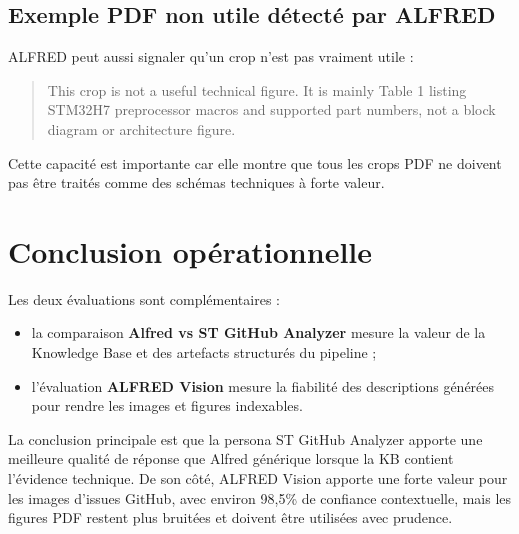 \documentclass[11pt,a4paper]{article}
\begin{document}
\subsection{Exemple PDF non utile détecté par ALFRED}

ALFRED peut aussi signaler qu'un crop n'est pas vraiment utile :

\begin{quote}\small
This crop is not a useful technical figure. It is mainly Table 1 listing STM32H7 preprocessor macros and supported part numbers, not a block diagram or architecture figure.
\end{quote}

Cette capacité est importante car elle montre que tous les crops PDF ne doivent pas être traités comme des schémas techniques à forte valeur.

\section{Conclusion opérationnelle}

Les deux évaluations sont complémentaires :

\begin{itemize}
  \item la comparaison \textbf{Alfred vs ST GitHub Analyzer} mesure la valeur de la Knowledge Base et des artefacts structurés du pipeline ;
  \item l'évaluation \textbf{ALFRED Vision} mesure la fiabilité des descriptions générées pour rendre les images et figures indexables.
\end{itemize}

La conclusion principale est que la persona ST GitHub Analyzer apporte une meilleure qualité de réponse que Alfred générique lorsque la KB contient l'évidence technique. De son côté, ALFRED Vision apporte une forte valeur pour les images d'issues GitHub, avec environ 98,5\% de confiance contextuelle, mais les figures PDF restent plus bruitées et doivent être utilisées avec prudence.
\end{document}
